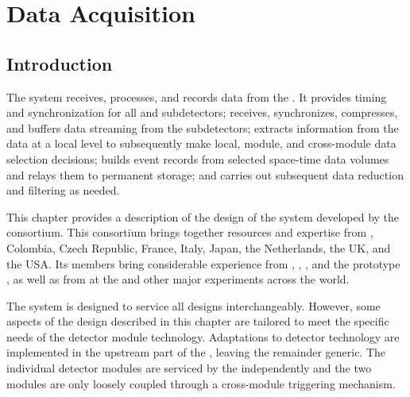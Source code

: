 \glsresetall

\chapter{Data Acquisition}
\label{ch:daq}

\section{Introduction}
\label{sec:daq:introduction}

The   system receives,
processes, and records data from the  .
It provides
timing and synchronization for all  and
subdetectors; receives, synchronizes, compresses, and buffers data
streaming from the subdetectors; extracts information from the data at a
local level to subsequently make local, module, and cross-module data
selection decisions; builds event records
from selected space-time data volumes 
and relays them to permanent storage; and carries out subsequent data
reduction and filtering as needed.

This chapter provides a description of the design of the 
  system developed by the  
 consortium. 
This consortium brings together resources and expertise from ,
Colombia, Czech Republic, France, Italy, Japan, the Netherlands, the UK, and the USA. 
Its members bring considerable experience from , ,
, and the
 prototype , as well as from  at the  and other major
 experiments across the world.

The system is designed to service all   designs
interchangeably.  However, some aspects of the  design described in
this chapter are tailored to meet the specific needs of the 
detector module technology.  Adaptations to detector technology are
implemented in the upstream part of the , leaving the remainder generic. The
individual detector modules are serviced by the  independently and the two modules are only loosely
coupled through a cross-module triggering mechanism.

